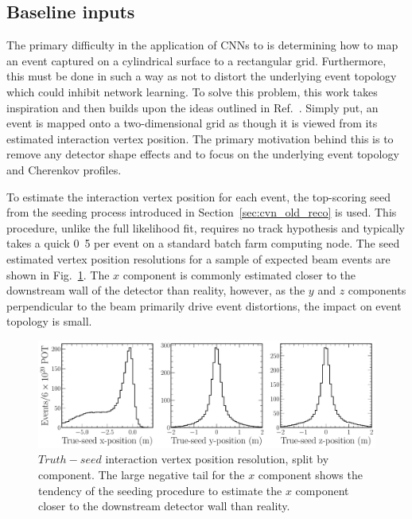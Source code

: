\subsection{Baseline inputs} %
\label{sec:cvn_baseline_inputs} %

The primary difficulty in the application of CNNs to \chips is determining how to map an event
captured on a cylindrical surface to a rectangular grid. Furthermore, this must be done in such a
way as not to distort the underlying event topology which could inhibit network learning. To solve
this problem, this work takes inspiration and then builds upon the ideas outlined in
Ref.~\cite{theodore2016}. Simply put, an event is mapped onto a two-dimensional grid as though it
is viewed from its estimated interaction vertex position. The primary motivation behind this is to
remove any detector shape effects and to focus on the underlying event topology and Cherenkov
profiles.

To estimate the interaction vertex position for each event, the top-scoring seed from the seeding
process introduced in Section~\ref{sec:cvn_old_reco} is used. This procedure, unlike the full
likelihood fit, requires no track hypothesis and typically takes a quick
\unit{0.5}{} per event on a standard batch farm computing node. The seed estimated
vertex position resolutions for a sample of expected beam events are shown in
Fig.~\ref{fig:explore_true_reco_vtx}. The $x$ component is commonly estimated closer to the
downstream wall of the detector than reality, however, as the $y$ and $z$ components perpendicular
to the beam primarily drive event distortions, the impact on event topology is small.

\begin{figure} %
    \includegraphics[width=\textwidth]{diagrams/6-cvn/chipsnet/explore_true_reco_vtx.pdf}
    \caption[Seed interaction vertex resolutions.]
    {$Truth - seed$ interaction vertex position resolution, split by component. The large negative
        tail for the $x$ component shows the tendency of the seeding procedure to estimate the $x$
        component closer to the downstream detector wall than reality.}
    \label{fig:explore_true_reco_vtx}
\end{figure}

